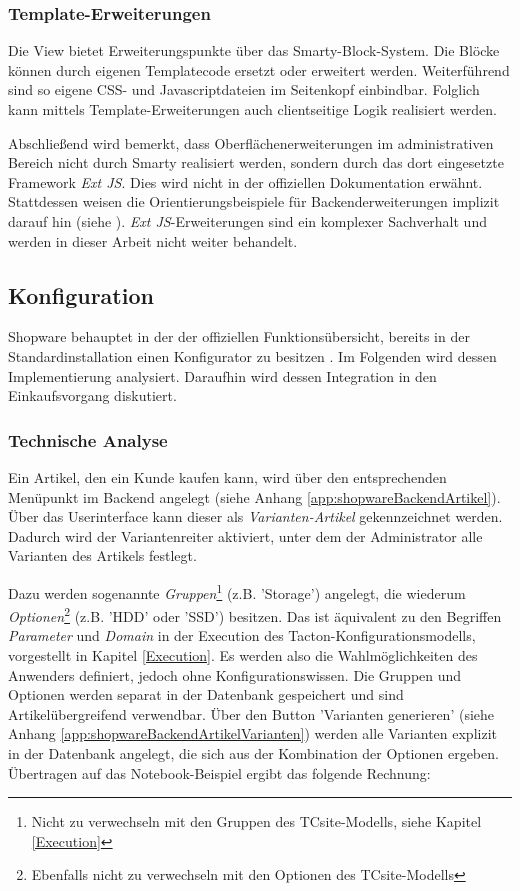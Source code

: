 \documentclass[11pt, a4paper, titlepage, listof=totoc, bibliography=totoc, index=totoc, twoside, openright, headings=normal]{scrreprt}
\begin{document}
\subsubsection*{Template-Erweiterungen}
Die View bietet Erweiterungspunkte über das Smarty-Block-System. Die Blöcke können durch eigenen Templatecode ersetzt oder erweitert werden. Weiterführend sind so eigene CSS- und Javascriptdateien im Seitenkopf einbindbar. Folglich kann mittels Template-Erweiterungen auch clientseitige Logik realisiert werden.

Abschließend wird bemerkt, dass Oberflächenerweiterungen im administrativen Bereich nicht durch Smarty realisiert werden, sondern durch das dort eingesetzte Framework \emph{Ext JS}. Dies wird nicht in der offiziellen Dokumentation erwähnt. Stattdessen weisen die Orientierungsbeispiele für Backenderweiterungen implizit darauf hin (siehe \citet{shopwareBackendPluginExamples}). \emph{Ext JS}-Erweiterungen sind ein komplexer Sachverhalt und werden in dieser Arbeit nicht weiter behandelt.

\subsection{Konfiguration}
\label{shopwareKonfiguration}
Shopware behauptet in der der offiziellen Funktionsübersicht, bereits in der Standardinstallation einen Konfigurator zu besitzen \citep{shopware5Funktionsuebersicht}. Im Folgenden wird dessen Implementierung analysiert. Daraufhin wird dessen Integration in den Einkaufsvorgang diskutiert.

\subsubsection{Technische Analyse}
\label{shopwareKonfigurationAnalyse}
Ein Artikel, den ein Kunde kaufen kann, wird über den entsprechenden Menüpunkt im Backend angelegt (siehe Anhang \ref{app:shopwareBackendArtikel}). Über das Userinterface kann dieser als \emph{Varianten-Artikel} gekennzeichnet werden. Dadurch wird der Variantenreiter aktiviert, unter dem der Administrator alle Varianten des Artikels festlegt.

Dazu werden sogenannte \emph{Gruppen}\footnote{Nicht zu verwechseln mit den Gruppen des TCsite-Modells, siehe Kapitel \ref{Execution}} (z.B. 'Storage') angelegt, die wiederum \emph{Optionen}\footnote{Ebenfalls nicht zu verwechseln mit den Optionen des TCsite-Modells} (z.B. 'HDD' oder 'SSD') besitzen. Das ist äquivalent zu den Begriffen \emph{Parameter} und \emph{Domain} in der Execution des Tacton-Konfigurationsmodells, vorgestellt in Kapitel \ref{Execution}. Es werden also die Wahlmöglichkeiten des Anwenders definiert, jedoch ohne Konfigurationswissen. Die Gruppen und Optionen werden separat in der Datenbank gespeichert und sind Artikelübergreifend verwendbar. Über den Button 'Varianten generieren' (siehe Anhang \ref{app:shopwareBackendArtikelVarianten}) werden alle Varianten explizit in der Datenbank angelegt, die sich aus der Kombination der Optionen ergeben. Übertragen auf das Notebook-Beispiel ergibt das folgende Rechnung:
\end{document}
